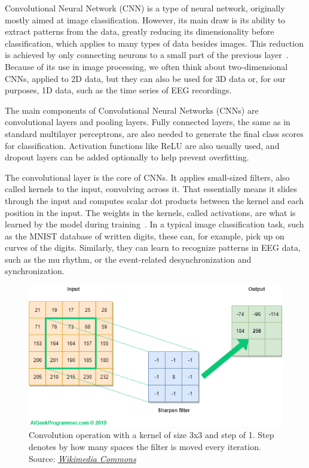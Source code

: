 \documentclass[english, he, bc, kiv, iso690alph, viewonly]{fasthesis}
\begin{document}
Convolutional Neural Network (CNN) is a type of neural network, originally mostly aimed at image classification. However, its main draw is its ability to extract patterns from the data, greatly reducing its dimensionality before classification, which applies to many types of data besides images. This reduction is achieved by only connecting neurons to a small part of the previous layer~\cite{oshea:cnn:15}. Because of its use in image processing, we often think about two-dimensional CNNs, applied to 2D data, but they can also be used for 3D data or, for our purposes, 1D data, such as the time series of EEG recordings.

The main components of Convolutional Neural Networks (CNNs) are convolutional layers and pooling layers. Fully connected layers, the same as in standard multilayer perceptrons, are also needed to generate the final class scores for classification. Activation functions like ReLU are also usually used, and dropout layers can be added optionally to help prevent overfitting.

The convolutional layer is the core of CNNs. It applies small-sized filters, also called kernels to the input, convolving across it. That essentially means it slides through the input and computes scalar dot products between the kernel and each position in the input. The weights in the kernels, called activations, are what is learned by the model during training~\cite{oshea:cnn:15}. In a typical image classification task, such as the MNIST database of written digits, these can, for example, pick up on curves of the digits. Similarly, they can learn to recognize patterns in EEG data, such as the mu rhythm, or the event-related desynchronization and synchronization.

\begin{figure}
	\includegraphics[width=\textwidth]{fig/conv.png}
	\caption[Convolution operation]{Convolution operation with a kernel of size 3x3 and step of 1. Step denotes by how many spaces the filter is moved every iteration. Source: \href{https://commons.wikimedia.org/wiki/File:CNN-filter-animation-1.gif}{\textit{Wikimedia Commons}}}
\end{figure}
\end{document}
